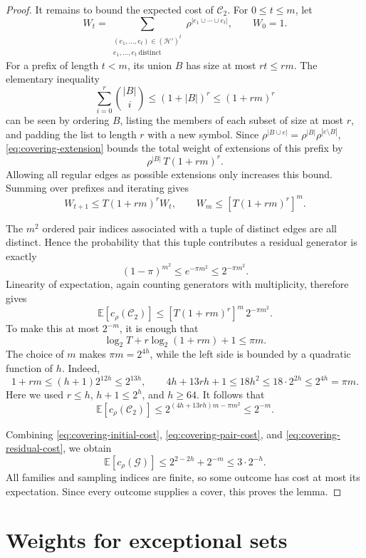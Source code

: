 \documentclass[11pt,letterpaper]{article}
\theoremstyle{definition}
\theoremstyle{remark}
\numberwithin{equation}{section}
\begin{document}
\begin{proof}
It remains to bound the expected cost of \(\mathcal C_2\). For
\(0\le t\le m\), let
\[
W_t=
\sum_{\substack{(e_1,\ldots,e_t)\in(\mathcal H')^t\\
                e_1,\ldots,e_t\ \text{distinct}}}
  \rho^{|e_1\cup\cdots\cup e_t|},
\qquad W_0=1.
\]
For a prefix of length \(t<m\), its union \(B\) has size at most \(rt\le rm\).
The elementary inequality
\[
\sum_{i=0}^r\binom{|B|}{i}\le(1+|B|)^r\le(1+rm)^r
\]
can be seen by ordering \(B\), listing the members of each subset of size
at most \(r\), and padding the list to length \(r\) with a new symbol.
Since
\(\rho^{|B\cup e|}=\rho^{|B|}\rho^{|e\setminus B|}\),
\eqref{eq:covering-extension} bounds the total weight of extensions of
this prefix by
\[
\rho^{|B|}\,T(1+rm)^r.
\]
Allowing all regular edges as possible extensions only increases this
bound. Summing over prefixes and iterating gives
\[
W_{t+1}\le T(1+rm)^rW_t,
\qquad
W_m\le[T(1+rm)^r]^m.
\]

The \(m^2\) ordered pair indices associated with a tuple of distinct
edges are all distinct. Hence the probability that this tuple contributes
a residual generator is exactly
\[
(1-\pi)^{m^2}\le e^{-\pi m^2}\le2^{-\pi m^2}.
\]
Linearity of expectation, again counting generators with multiplicity,
therefore gives
\[
\mathbb E[c_\rho(\mathcal C_2)]
\le[T(1+rm)^r]^m\,2^{-\pi m^2}.
\]
To make this at most \(2^{-m}\), it is enough that
\[
\log_2 T+r\log_2(1+rm)+1\le\pi m.
\]
The choice of \(m\) makes \(\pi m=2^{4h}\), while the left side
is bounded by a quadratic function of \(h\). Indeed,
\[
1+rm\le(h+1)2^{12h}\le2^{13h},
\qquad
4h+13rh+1\le18h^2
\le18\cdot2^{2h}\le2^{4h}=\pi m.
\]
Here we used \(r\le h\), \(h+1\le2^h\), and \(h\ge64\).
It follows that
\begin{equation}\label{eq:covering-residual-cost}
\mathbb E[c_\rho(\mathcal C_2)]
\le2^{(4h+13rh)m-\pi m^2}\le2^{-m}.
\end{equation}

Combining \eqref{eq:covering-initial-cost},
\eqref{eq:covering-pair-cost}, and
\eqref{eq:covering-residual-cost}, we obtain
\[
\mathbb E[c_\rho(\mathcal G)]
\le2^{2-2h}+2^{-m}\le3\cdot2^{-h}.
\]
All families and sampling indices are finite, so some outcome has cost
at most its expectation. Since every outcome supplies a cover, this proves
the lemma.
\end{proof}

\section{Weights for exceptional sets}
\label{sec:weights}
\end{document}
